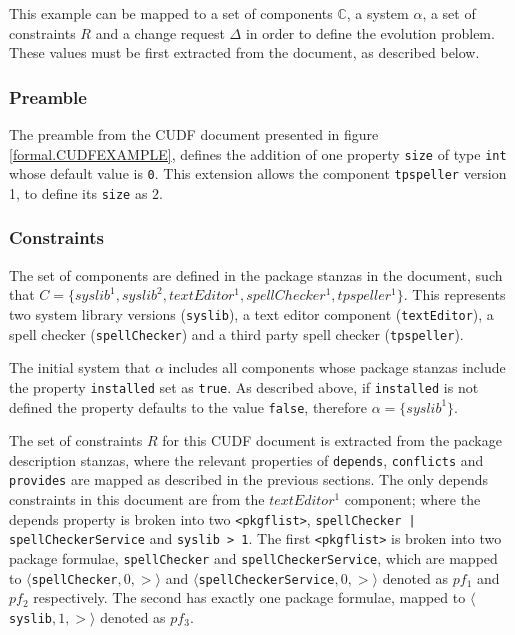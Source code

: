 This example can be mapped to a set of components $\mathbb{C}$, a system $\alpha$, a set of constraints $R$ and a change request $\Delta$ in order to define the evolution problem.
These values must be first extracted from the document, as described below.

\subsubsection{Preamble}
The preamble from the CUDF document presented in figure \ref{formal.CUDFEXAMPLE}, 
defines the addition of one property \verb+size+ of type \verb+int+ whose default value is \verb+0+.
This extension allows the component \verb+tpspeller+ version 1, to define its \verb+size+ as $2$.

\subsubsection{Constraints}

The set of components are defined in the package stanzas in the document,
such that $C = \{syslib^1, syslib^2,  textEditor^1,  spellChecker^1,  tpspeller^1\}$.
This represents two system library versions (\verb+syslib+), a text editor component (\verb+textEditor+), a spell checker (\verb+spellChecker+) and a third party spell checker (\verb+tpspeller+).

The initial system that $\alpha$ includes all components whose package stanzas include the property \verb+installed+ set as \verb+true+.
As described above, if \verb+installed+ is not defined the property defaults to the value \verb+false+,
therefore $\alpha = \{ syslib^1 \}$.

The set of constraints $R$ for this CUDF document is extracted from the package description stanzas, where the relevant properties of \verb+depends+, \verb+conflicts+ and \verb+provides+ are
mapped as described in the previous sections. 
The only depends constraints in this document are from the $textEditor^1$ component;
where the depends property is broken into two \verb+<pkgflist>+, \verb+spellChecker | spellCheckerService+ and \verb+syslib > 1+.
The first \verb+<pkgflist>+ is broken into two package formulae, \verb+spellChecker+  and \verb+spellCheckerService+,
which are mapped to $\langle $\verb+spellChecker+$,0,>\rangle$ and $\langle $\verb+spellCheckerService+$,0,>\rangle$ denoted as $pf_1$ and $pf_2$ respectively.
The second has exactly one package formulae, mapped to $\langle $\verb+syslib+$,1,>\rangle$ denoted as $pf_3$.

